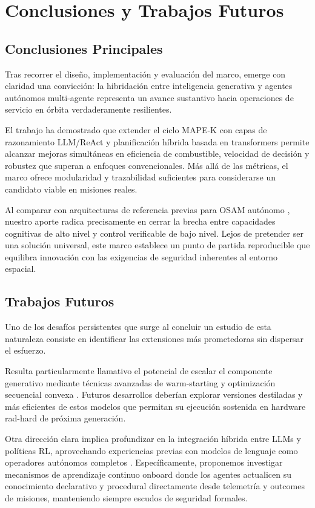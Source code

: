 \section{Conclusiones y Trabajos Futuros}

\subsection{Conclusiones Principales}

Tras recorrer el diseño, implementación y evaluación del marco, emerge con claridad una convicción: la hibridación entre inteligencia generativa y agentes autónomos multi-agente representa un avance sustantivo hacia operaciones de servicio en órbita verdaderamente resilientes. 

El trabajo ha demostrado que extender el ciclo MAPE-K con capas de razonamiento LLM/ReAct y planificación híbrida basada en transformers permite alcanzar mejoras simultáneas en eficiencia de combustible, velocidad de decisión y robustez que superan a enfoques convencionales. Más allá de las métricas, el marco ofrece modularidad y trazabilidad suficientes para considerarse un candidato viable en misiones reales.

Al comparar con arquitecturas de referencia previas para OSAM autónomo \cite{RefArch_OSAM2022}, nuestro aporte radica precisamente en cerrar la brecha entre capacidades cognitivas de alto nivel y control verificable de bajo nivel. Lejos de pretender ser una solución universal, este marco establece un punto de partida reproducible que equilibra innovación con las exigencias de seguridad inherentes al entorno espacial.

\subsection{Trabajos Futuros}

Uno de los desafíos persistentes que surge al concluir un estudio de esta naturaleza consiste en identificar las extensiones más prometedoras sin dispersar el esfuerzo. 

Resulta particularmente llamativo el potencial de escalar el componente generativo mediante técnicas avanzadas de warm-starting y optimización secuencial convexa \cite{Guffanti2024_ART}. Futuros desarrollos deberían explorar versiones destiladas y más eficientes de estos modelos que permitan su ejecución sostenida en hardware rad-hard de próxima generación.

Otra dirección clara implica profundizar en la integración híbrida entre LLMs y políticas RL, aprovechando experiencias previas con modelos de lenguaje como operadores autónomos completos \cite{Carrasco2025_LLMSpace}. Específicamente, proponemos investigar mecanismos de aprendizaje continuo onboard donde los agentes actualicen su conocimiento declarativo y procedural directamente desde telemetría y outcomes de misiones, manteniendo siempre escudos de seguridad formales.


